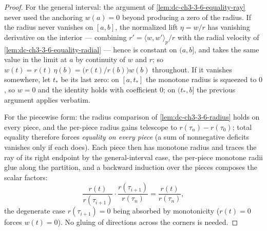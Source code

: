 \begin{proof}
  \sketch
  \leanok
  For the general interval: the argument of
  \cref{lem:dc-ch3-3-6-equality-ray} never used the anchoring $w(a)=0$
  beyond producing a zero of the radius. If the radius never vanishes on
  $[a,b]$, the normalized lift $\eta=w/r$ has vanishing derivative on the
  interior — combining $r'=\langle w,w'\rangle_p/r$ with the radial velocity
  of \cref{lem:dc-ch3-3-6-equality-radial} — hence is constant on $(a,b]$,
  and takes the same value in the limit at $a$ by continuity of $w$ and $r$;
  so $w(t)=r(t)\,\eta(b)=\bigl(r(t)/r(b)\bigr)w(b)$ throughout. If it
  vanishes somewhere, let $t_*$ be its last zero: on $[a,t_*]$ the monotone
  radius is squeezed to $0$, so $w=0$ and the identity holds with
  coefficient $0$; on $(t_*,b]$ the previous argument applies verbatim.

  For the piecewise form: the radius comparison of
  \cref{lem:dc-ch3-3-6-radius} holds on every piece, and the per-piece
  radius gains telescope to $r(\tau_n)-r(\tau_0)$; total equality therefore
  forces \emph{equality on every piece} (a sum of nonnegative deficits
  vanishes only if each does). Each piece then has monotone radius and
  traces the ray of its right endpoint by the general-interval case, the
  per-piece monotone radii glue along the partition, and a backward
  induction over the pieces composes the scalar factors:
  $$\frac{r(t)}{r(\tau_{i+1})}\cdot\frac{r(\tau_{i+1})}{r(\tau_n)}
    =\frac{r(t)}{r(\tau_n)},$$
  the degenerate case $r(\tau_{i+1})=0$ being absorbed by monotonicity
  ($r(t)=0$ forces $w(t)=0$). No gluing of directions across the corners is
  needed.
\end{proof}

